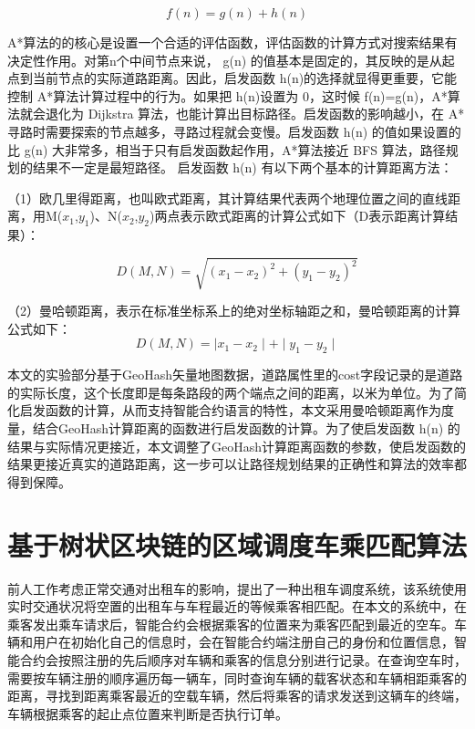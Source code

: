 \begin{equation}
  \label{eqn:calCost}
  f(n)=g(n)+h(n)
\end{equation}

A*算法的的核心是设置一个合适的评估函数，评估函数的计算方式对搜索结果有决定性作用。对第n个中间节点来说， g(n) 的值基本是固定的，其反映的是从起点到当前节点的实际道路距离。因此，启发函数 h(n)的选择就显得更重要，它能控制 A*算法计算过程中的行为。如果把 h(n)设置为 0，这时候 f(n)=g(n)，A*算法就会退化为 Dijkstra 算法，也能计算出目标路径。启发函数的影响越小，在 A*寻路时需要探索的节点越多，寻路过程就会变慢。启发函数 h(n) 的值如果设置的比 g(n) 大非常多，相当于只有启发函数起作用，A*算法接近 BFS 算法，路径规划的结果不一定是最短路径。
启发函数 h(n) 有以下两个基本的计算距离方法：

（1）欧几里得距离，也叫欧式距离，其计算结果代表两个地理位置之间的直线距离，用M($x_1$,$y_1$)、N($x_2$,$y_2$)两点表示欧式距离的计算公式如下（D表示距离计算结果）：

\begin{equation}
  \label{eqn:Euclid}
  D(M, N)=\sqrt{(x_1-x_2)^{2}+(y_1-y_2)^{2}}
\end{equation}

（2）曼哈顿距离，表示在标准坐标系上的绝对坐标轴距之和，曼哈顿距离的计算公式如下：
\begin{equation}
  \label{eqn:manhattan}
  D(M, N)=\mid x_1-x_2 \mid+\mid y_1-y_2 \mid
\end{equation}


本文的实验部分基于GeoHash矢量地图数据，道路属性里的cost字段记录的是道路的实际长度，这个长度即是每条路段的两个端点之间的距离，以米为单位。为了简化启发函数的计算，从而支持智能合约语言的特性，本文采用曼哈顿距离作为度量，结合GeoHash计算距离的函数进行启发函数的计算。为了使启发函数 h(n) 的结果与实际情况更接近，本文调整了GeoHash计算距离函数的参数，使启发函数的结果更接近真实的道路距离，这一步可以让路径规划结果的正确性和算法的效率都得到保障。


\section{基于树状区块链的区域调度车乘匹配算法}

前人工作考虑正常交通对出租车的影响，提出了一种出租车调度系统，该系统使用实时交通状况将空置的出租车与车程最近的等候乘客相匹配。在本文的系统中，在乘客发出乘车请求后，智能合约会根据乘客的位置来为乘客匹配到最近的空车。车辆和用户在初始化自己的信息时，会在智能合约端注册自己的身份和位置信息，智能合约会按照注册的先后顺序对车辆和乘客的信息分别进行记录。在查询空车时，需要按车辆注册的顺序遍历每一辆车，同时查询车辆的载客状态和车辆相距乘客的距离，寻找到距离乘客最近的空载车辆，然后将乘客的请求发送到这辆车的终端，车辆根据乘客的起止点位置来判断是否执行订单。

